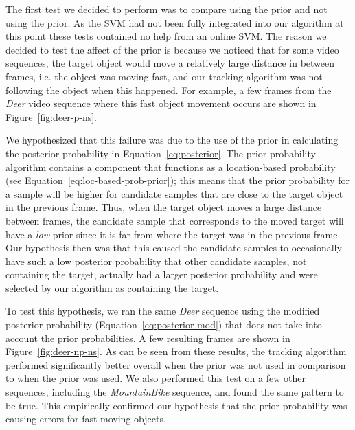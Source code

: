 \documentclass{sig-alternate-05-2015}
\begin{document}
The first test we decided to perform was to compare using the prior and not using the prior.
As the SVM had not been fully integrated into our algorithm at this point these tests contained no help from an online SVM. 
The reason we decided to test the affect of the prior is because we noticed that for some video sequences, the target object would move a relatively large distance in between frames, i.e. the object was moving fast, and our tracking algorithm was not following the object when this happened.
For example, a few frames from the \textit{Deer} video sequence where this fast object movement occurs are shown in Figure~\ref{fig:deer-p-ns}.

We hypothesized that this failure was due to the use of the prior in calculating the posterior probability in Equation~\ref{eq:posterior}.
The prior probability algorithm contains a component that functions as a location-based probability (see Equation~\ref{eq:loc-based-prob-prior}); this means that the prior probability for a sample will be higher for candidate samples that are close to the target object in the previous frame.
Thus, when the target object moves a large distance between frames, the candidate sample that corresponds to the moved target will have a \textit{low} prior since it is far from where the target was in the previous frame.
Our hypothesis then was that this caused the candidate samples to occasionally have such a low posterior probability that other candidate samples, not containing the target, actually had a larger posterior probability and were selected by our algorithm as containing the target.

To test this hypothesis, we ran the same \textit{Deer} sequence using the modified posterior probability (Equation~\ref{eq:posterior-mod}) that does not take into account the prior probabilities.
A few resulting frames are shown in Figure~\ref{fig:deer-np-ns}.
As can be seen from these results, the tracking algorithm performed significantly better overall when the prior was not used in comparison to when the prior was used.
We also performed this test on a few other sequences, including the \textit{MountainBike} sequence, and found the same pattern to be true.
This empirically confirmed our hypothesis that the prior probability was causing errors for fast-moving objects.
\end{document}
